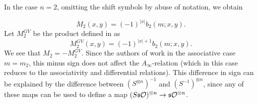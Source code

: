 \documentclass[join.tex]{subfiles}
\begin{document}
\begin{remark}
In the case $n=2$, omitting the shift symbols by abuse of notation, we obtain 

\[M_2(x,y)=(-1)^{|x|}b_2(m;x,y).\]
Let $M^{GV}_2$ be the product defined in \cite{GV} as \[M^{GV}_2(x,y)=(-1)^{|x|+1}b_2(m;x,y).\] We see that $M_2=-M^{GV}_2$. Since the authors of \cite{GV} work in the associative case $m=m_2$, this minus sign does not affect the $A_\infty$-relation (which in this case reduces to the associativity and differential relations). This difference in sign can be explained by the difference between $(S^{\otimes n})^{-1}$ and $(S^{-1})^{\otimes n}$, since any of these maps can be used to define a map $(S\mathfrak{s}{\mathcal O})^{\otimes n}\to \mathfrak{s}{\mathcal O}^{\otimes n}$. 
\end{remark}
%






%
%
\end{document}
